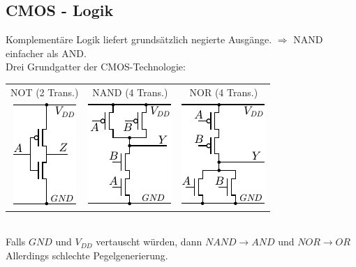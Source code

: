 \documentclass[6pt,a4paper]{scrartcl}
\newcommand{\ra}[0]{\ensuremath{\rightarrow}} 									%
\begin{document}
\begin{multicols}{3}
\section{CMOS - Logik}
Komplementäre Logik liefert grundsätzlich negierte Ausgänge. $\Rightarrow$ NAND einfacher als AND.\\
Drei Grundgatter der CMOS-Technologie:\\
	\begin{tabular}{ccc}
		NOT (2 Trans.) & NAND (4 Trans.) & NOR (4 Trans.)\\
		\includegraphics{img/ds/mosfet_not.pdf} \quad & \includegraphics{img/ds/mosfet_nand.pdf} \quad & \includegraphics{img/ds/mosfet_nor.pdf} \\
	\end{tabular}\\
	Falls $GND$ und $V_{DD}$ vertauscht würden, dann $NAND \ra AND$ und $NOR \ra OR$\\
	Allerdings schlechte Pegelgenerierung.
	

\end{multicols}
\end{document}
